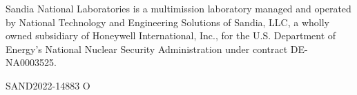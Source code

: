 \documentclass[letterpaper]{scrartcl}
\begin{document}
\vspace*{\fill}
\noindent
Sandia National Laboratories is a multimission laboratory managed and
operated by National Technology and Engineering Solutions of Sandia,
LLC, a wholly owned subsidiary of Honeywell International, Inc., for
the U.S. Department of Energy's National Nuclear Security
Administration under contract DE-NA0003525.

SAND2022-14883 O
\end{document}
